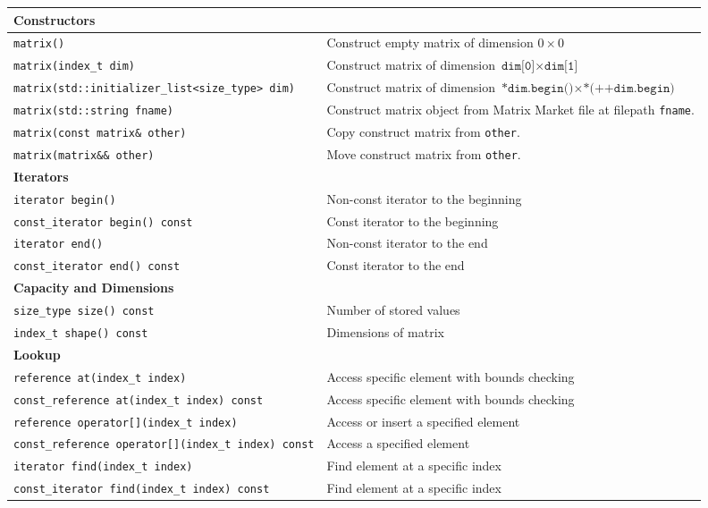 \begin{tabularx}{\textwidth}{l X}
\textbf{Constructors}\\
\hline
\texttt{matrix()} & Construct empty matrix of dimension $0 \times 0$\\
\hline
\texttt{matrix(index\_t dim)} & Construct matrix of dimension $\texttt{dim[0]} \times \texttt{dim[1]}$\\
\hline
\texttt{matrix(std::initializer\_list<size\_type> dim)} & Construct matrix of dimension $\texttt{*dim.begin()} \times \texttt{*(++dim.begin)}$\\
\hline
\texttt{matrix(std::string fname)} & Construct matrix object from Matrix Market file at filepath \texttt{fname}.\\
\hline
\texttt{matrix(const matrix\& other)} & Copy construct matrix from \texttt{other}.\\
\hline
\texttt{matrix(matrix\&\& other)} & Move construct matrix from \texttt{other}.\\
\hline
\textbf{Iterators}\\
\hline
\texttt{iterator begin()} & Non-const iterator to the beginning\\
\hline
\texttt{const\_iterator begin() const} & Const iterator to the beginning\\
\hline
\texttt{iterator end()} & Non-const iterator to the end\\
\hline
\texttt{const\_iterator end() const} & Const iterator to the end\\
\hline
\textbf{Capacity and Dimensions}\\
\hline
\texttt{size\_type size() const} & Number of stored values\\
\hline
\texttt{index\_t shape() const} & Dimensions of matrix\\
\hline
\textbf{Lookup}\\
\texttt{reference at(index\_t index)} & Access specific element with bounds checking\\
\hline
\texttt{const\_reference at(index\_t index) const} & Access specific element with bounds checking\\
\hline
\texttt{reference operator[](index\_t index)} & Access or insert a specified element\\
\hline
\texttt{const\_reference operator[](index\_t index) const} & Access a specified element\\
\hline
\texttt{iterator find(index\_t index)} & Find element at a specific index\\
\hline
\texttt{const\_iterator find(index\_t index) const} & Find element at a specific index\\
\end{tabularx}

